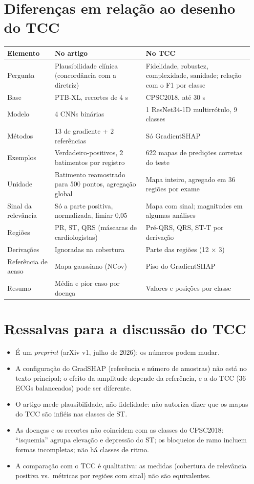 \documentclass[11pt,a4paper]{article}
\begin{document}
\section{Diferenças em relação ao desenho do TCC}
\begin{center}\small
\begin{tabularx}{\linewidth}{p{3cm}XX}
\toprule
\textbf{Elemento} & \textbf{No artigo} & \textbf{No TCC} \\
\midrule
Pergunta & Plausibilidade clínica (concordância com a diretriz) & Fidelidade, robustez, complexidade, sanidade; relação com o F1 por classe \\
Base & PTB-XL, recortes de 4 s & CPSC2018, até 30 s \\
Modelo & 4 CNNs binárias & 1 ResNet34-1D multirrótulo, 9 classes \\
Métodos & 13 de gradiente + 2 referências & Só GradientSHAP \\
Exemplos & Verdadeiro-positivos, 2 batimentos por registro & 622 mapas de predições corretas do teste \\
Unidade & Batimento reamostrado para 500 pontos, agregação global & Mapa inteiro, agregado em 36 regiões por exame \\
Sinal da relevância & Só a parte positiva, normalizada, limiar 0,05 & Mapa com sinal; magnitudes em algumas análises \\
Regiões & PR, ST, QRS (máscaras de cardiologistas) & Pré-QRS, QRS, ST-T por derivação \\
Derivações & Ignoradas na cobertura & Parte das regiões (12 $\times$ 3) \\
Referência de acaso & Mapa gaussiano (NCov) & Piso do GradientSHAP \\
Resumo & Média e pior caso por doença & Valores e posições por classe \\
\bottomrule
\end{tabularx}
\end{center}

\section{Ressalvas para a discussão do TCC}
\begin{itemize}
\item É um \textit{preprint} (arXiv v1, julho de 2026); os números podem mudar.
\item A configuração do GradSHAP (referência e número de amostras) não está no texto principal; o efeito da amplitude depende da referência, e a do TCC (36 ECGs balanceados) pode ser diferente.
\item O artigo mede plausibilidade, não fidelidade: não autoriza dizer que os mapas do TCC são infiéis nas classes de ST.
\item As doenças e os recortes não coincidem com as classes do CPSC2018: “isquemia” agrupa elevação e depressão do ST; os bloqueios de ramo incluem formas incompletas; não há classes de ritmo.
\item A comparação com o TCC é qualitativa: as medidas (cobertura de relevância positiva vs.\ métricas por regiões com sinal) não são equivalentes.
\end{itemize}
\end{document}
